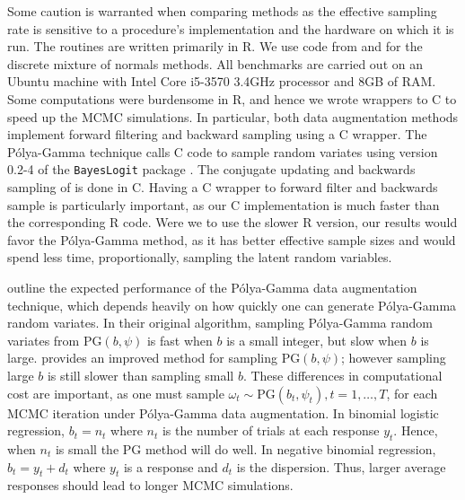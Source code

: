 \documentclass[12pt]{article}
\newcommand{\Polya}{P\'{o}lya}
\newcommand{\PG}{\text{PG}}
\begin{document}
Some caution is warranted when comparing methods as the effective sampling rate
is sensitive to a procedure's implementation and the hardware on which it is
run. The routines are written primarily in R.  We use code from
\cite{binomlogit-2012} and \cite{fruhwirth-schnatter-book-2007} for the discrete
mixture of normals methods.  All benchmarks are carried out on an Ubuntu machine
with Intel Core i5-3570 3.4GHz processor and 8GB of RAM.  Some computations were
burdensome in R, and hence we wrote wrappers to C to speed up the MCMC
simulations.  In particular, both data augmentation methods implement forward
filtering and backward sampling using a C wrapper.  The \Polya-Gamma technique
calls C code to sample random variates using version 0.2-4 of the
\texttt{BayesLogit} package \citep{bayeslogit-2013}.  The conjugate updating and
backwards sampling of \cite{migon-etal-2013} is done in C.  Having a C wrapper
to forward filter and backwards sample is particularly important, as our C
implementation is much faster than the corresponding R code.  Were we to use the
slower R version, our results would favor the \Polya-Gamma method, as it has
better effective sample sizes and would spend less time, proportionally,
sampling the latent random variables.

\cite{polson-etal-2013} outline the expected performance of the \Polya-Gamma
data augmentation technique, which depends heavily on how quickly one can
generate \Polya-Gamma random variates.  In their original algorithm, sampling
\Polya-Gamma random variates from $\PG(b,\psi)$ is fast when $b$ is a small
integer, but slow when $b$ is large. \cite{windle-thesis-2013} provides an
improved method for sampling $\PG(b,\psi)$; however sampling large $b$ is still
slower than sampling small $b$.  These differences in computational cost are
important, as one must sample $\omega_t \sim \PG(b_t, \psi_t), t=1,\ldots,T$,
for each MCMC iteration under \Polya-Gamma data augmentation.  In binomial
logistic regression, $b_t = n_t$ where $n_t$ is the number of trials at each
response $y_t$.  Hence, when $n_t$ is small the PG method will do well.  In
negative binomial regression, $b_t = y_t + d_t$ where $y_t$ is a response and
$d_t$ is the dispersion.  Thus, larger average responses should lead to longer
MCMC simulations.
\end{document}

